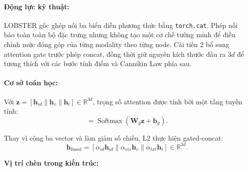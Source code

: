 \paragraph{Động lực kỹ thuật:}
LOBSTER gốc ghép nối ba biểu diễn phương thức bằng \texttt{torch.cat}. Phép nối bảo toàn toàn bộ đặc trưng nhưng không tạo một cơ chế tường minh để điều chỉnh mức đóng góp của từng modality theo từng node. Cải tiến 2 bổ sung attention gate trước phép concat, đồng thời giữ nguyên kích thước đầu ra $3d$ để tương thích với các bước tính điểm và Cannikin Law phía sau.

\paragraph{Cơ sở toán học:}
Với $\mathbf z=[\mathbf h_{id}\|\mathbf h_v\|\mathbf h_t]\in\mathbb R^{3d}$, trọng số attention được tính bởi một tầng tuyến tính:
\begin{equation}
[\alpha_{id},\alpha_{vis},\alpha_{txt}]
=\operatorname{Softmax}\!\left(\mathbf W_g\mathbf z+\mathbf b_g\right).
\end{equation}

Thay vì cộng ba vector và làm giảm số chiều, L2 thực hiện gated-concat:
\begin{equation}
\mathbf h_{\text{fused}}
=\left[\alpha_{id}\mathbf h_{id}\|\alpha_{vis}\mathbf h_v\|\alpha_{txt}\mathbf h_t\right]
\in\mathbb R^{3d}.
\end{equation}

\par\medskip
\noindent\textbf{Vị trí chèn trong kiến trúc:}\par
\nopagebreak[4]

